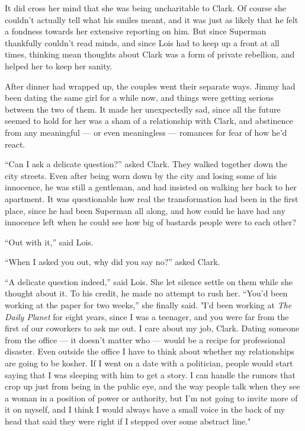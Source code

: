 It did cross her mind that she was being uncharitable to Clark. Of
course she couldn't actually tell what his smiles meant, and it was just
as likely that he felt a fondness towards her extensive reporting on
him. But since Superman thankfully couldn't read minds, and since Lois
had to keep up a front at all times, thinking mean thoughts about Clark
was a form of private rebellion, and helped her to keep her sanity.

After dinner had wrapped up, the couples went their separate ways. Jimmy
had been dating the same girl for a while now, and things were getting
serious between the two of them. It made her unexpectedly sad, since all
the future seemed to hold for her was a sham of a relationship with
Clark, and abstinence from any meaningful --- or even meaningless ---
romances for fear of how he'd react.

``Can I ask a delicate question?'' asked Clark. They walked together
down the city streets. Even after being worn down by the city and losing
some of his innocence, he was still a gentleman, and had insisted on
walking her back to her apartment. It was questionable how real the
transformation had been in the first place, since he had been Superman
all along, and how could he have had any innocence left when he could
see how big of bastards people were to each other?

``Out with it,'' said Lois.

``When I asked you out, why did you say no?'' asked Clark.

``A delicate question indeed,'' said Lois. She let silence settle on
them while she thought about it. To his credit, he made no attempt to
rush her. ``You'd been working at the paper for two weeks,'' she finally
said. "I'd been working at \emph{The Daily Planet} for eight years,
since I was a teenager, and you were far from the first of our coworkers
to ask me out. I care about my job, Clark. Dating someone from the
office --- it doesn't matter who --- would be a recipe for professional
disaster. Even outside the office I have to think about whether my
relationships are going to be kosher. If I went on a date with a
politician, people would start saying that I was sleeping with him to
get a story. I can handle the rumors that crop up just from being in the
public eye, and the way people talk when they see a woman in a position
of power or authority, but I'm not going to invite more of it on myself,
and I think I would always have a small voice in the back of my head
that said they were right if I stepped over some abstract line."

